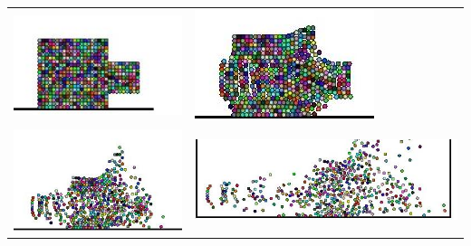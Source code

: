 \documentclass[a0,portrait]{a0poster}
\begin{document}
\begin{multicols}{2}
\FloatBarrier
\begin{center}\vspace{3cm}
\begin{tabular}{ll}
\includegraphics[width=0.3\linewidth]{../images/seq2-1.jpg} &
\includegraphics[width=0.3\linewidth]{../images/seq2-2.jpg} \\
\includegraphics[width=0.3\linewidth]{../images/seq2-3.jpg} &
\includegraphics[width=0.4\linewidth]{../images/seq2-4.jpg} \\
\end{tabular}
\label{fig:sequenciaBloco2}
\end{center}\vspace{1cm}
\FloatBarrier




\end{multicols}
\end{document}
